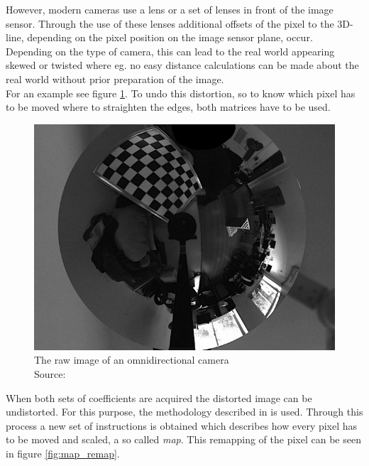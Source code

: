 However, modern cameras use a lens or a set of lenses in front of the image sensor. Through the use of these lenses additional offsets of the pixel to the 3D-line, depending on the pixel position on the image sensor plane, occur. \\

Depending on the type of camera, this can lead to the real world appearing skewed or twisted where eg. no easy distance calculations can be made about the real world without prior preparation of the image. \cite{cv} \cite{mat_calib}\\

For an example see figure \ref{fig:omni_cam}. To undo this distortion, so to know which pixel has to be moved where to straighten the edges, both matrices have to be used.

\begin{figure}[H]
    \centering
    \includegraphics[width=.6\textwidth]{image/2/omnidirectional.png}
    \caption{The raw image of an omnidirectional camera\\Source: \cite{cv}}
    \label{fig:omni_cam}
\end{figure}

When both sets of coefficients are acquired the distorted image can be undistorted. For this purpose, the methodology described in \cite{distort_cv} is used. Through this process a new set of instructions is obtained which describes how every pixel has to be moved and scaled, a so called \textit{map}. \cite{distort_cv} \cite{remap} This remapping of the pixel can be seen in figure \ref{fig:map_remap}. \\

